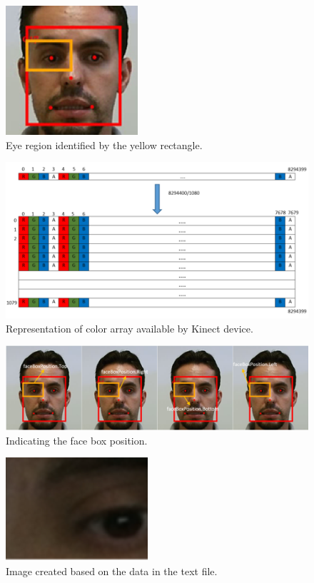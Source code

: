 \documentclass[10pt, conference]{IEEEtran}
\begin{document}
\begin{figure}[t]
	\centering
	\includegraphics{figures/pic10.png}
    \caption{Eye region identified by the yellow rectangle.}
    \label{fig:fig10}
\end{figure}

\begin{figure}[t]
	\centering
	\includegraphics{figures/pic11.png}
    \caption{Representation of color array available by Kinect device.}
    \label{fig:fig11}
\end{figure}

\begin{figure}[t]
	\centering
	\includegraphics{figures/pic12.png}
    \caption{Indicating the face box position.}
    \label{fig:fig12}
\end{figure}

\begin{figure}[t]
	\centering
	\includegraphics{figures/pic13.png}
    \caption{Image created based on the data in the text file.}
    \label{fig:fig13}
\end{figure}
\end{document}
